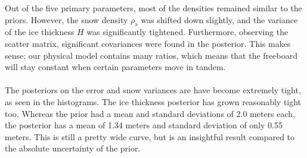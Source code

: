 \documentclass[12pt, letterpaper]{article}
\begin{document}
Out of the five primary parameters, most of the densities remained similar to the priors. However, the snow density $\rho_s$ was shifted down slightly,
and the variance of the ice thickness $H$ was significantly tightened. Furthermore, observing the scatter matrix, significant covariances were
found in the posterior. This makes sense; our physical model contains many ratios, which means that the freeboard will stay constant when
certain parameters move in tandem.
\\\\
The posteriors on the error and snow variances are have become extremely tight, as seen in the histograms. The ice thickness
posterior has grown reasonably tight too. Whereas the prior had a mean and standard deviations of 2.0 meters each, the posterior
has a mean of 1.34 meters and standard deviation of only 0.55 meters. This is still a pretty wide curve, but is an insightful result
compared to the absolute uncertainty of the prior.
\end{document}
